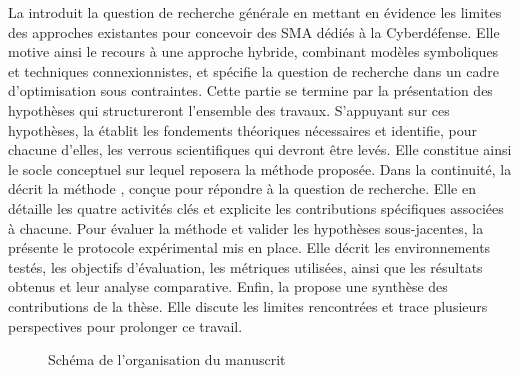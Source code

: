 \noindent
La  introduit la question de recherche générale en mettant en évidence les limites des approches existantes pour concevoir des SMA dédiés à la Cyberdéfense. Elle motive ainsi le recours à une approche hybride, combinant modèles symboliques et techniques connexionnistes, et spécifie la question de recherche dans un cadre d'optimisation sous contraintes. Cette partie se termine par la présentation des hypothèses qui structureront l'ensemble des travaux.
%
S'appuyant sur ces hypothèses, la  établit les fondements théoriques nécessaires et identifie, pour chacune d'elles, les verrous scientifiques qui devront être levés. Elle constitue ainsi le socle conceptuel sur lequel reposera la méthode proposée.
%
Dans la continuité, la  décrit la méthode , conçue pour répondre à la question de recherche. Elle en détaille les quatre activités clés et explicite les contributions spécifiques associées à chacune.
%
Pour évaluer la méthode et valider les hypothèses sous-jacentes, la  présente le protocole expérimental mis en place. Elle décrit les environnements testés, les objectifs d'évaluation, les métriques utilisées, ainsi que les résultats obtenus et leur analyse comparative.
%
Enfin, la  propose une synthèse des contributions de la thèse. Elle discute les limites rencontrées et trace plusieurs perspectives pour prolonger ce travail.

\begin{figure}[h!]
  \centering
  \resizebox{\textwidth}{!}{%
    
  }
  \caption{Schéma de l'organisation du manuscrit}
  \label{fig:organisation_manuscrit}
\end{figure}

\cleardoublepage
